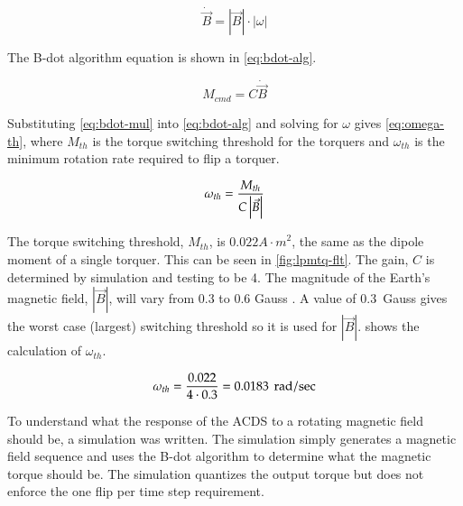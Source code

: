 \begin{equation}
    \dot{\vec{B}} = \left| \vec{B} \right| \cdot \left| \omega \right|
    \label{eq:bdot-mul}
\end{equation}

The B-dot algorithm equation is shown in \cref{eq:bdot-alg}.

\begin{equation}
    M_{cmd} = C \dot{\vec{B}} 
    \label{eq:bdot-alg}
\end{equation}

Substituting \cref{eq:bdot-mul} into \cref{eq:bdot-alg} and solving for $\omega$ gives \cref{eq:omega-th}, where $M_{th}$ is the torque switching threshold for the torquers and $\omega_{th}$ is the minimum rotation rate required to flip a torquer.


\begin{equation}
    \omega _ {th} = {M _ {th} \over{ {C \left| \vec{B} \right|}}}
    \label{eq:omega-th}
\end{equation}

The torque switching threshold, $M_{th}$, is $0.022 \unit{A \cdot m} ^2$, the same as the dipole moment of a single torquer. This can be seen in \cref{fig:lpmtq-flt}. The gain, $C$ is determined by simulation and testing to be 4. The magnitude of the Earth's magnetic field, ${\left| \vec{B} \right|}$, will vary from 0.3 to 0.6 Gauss \cite[pp.~114]{Wertz}. A value of 0.3~Gauss gives the worst case (largest) switching threshold so it is used for ${\left| \vec{B} \right|}$.  shows the calculation of $\omega_{th}$.

\begin{equation}
    \omega _ {th} = { 0.022 \over{ {4 \cdot 0.3}}} = 0.0183 ~ \, \mathrm{rad / sec}
    \label{eq:omega-th-calc}
\end{equation}

To understand what the response of the \ac{ACDS} to a rotating magnetic field should be, a simulation was written. The simulation simply generates a magnetic field sequence and uses the B-dot algorithm to determine what the magnetic torque should be. The simulation quantizes the output torque but does not enforce the one flip per time step requirement.

